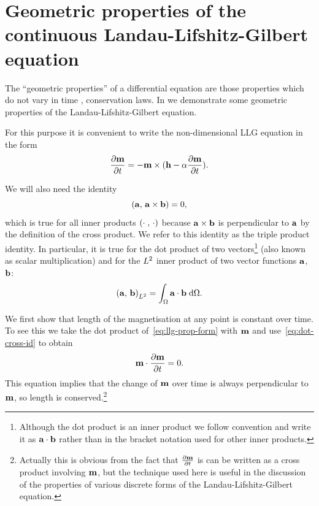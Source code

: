 \section{Geometric properties of the continuous Landau-Lifshitz-Gilbert equation}
\label{sec:prop-cont-llg}

The ``geometric properties'' of a differential equation are those properties which do not vary in time \cite[73]{Iserles2009}, \ie conservation laws.
In  we demonstrate some geometric properties of the Landau-Lifshitz-Gilbert equation.

For this purpose it is convenient to write the non-dimensional LLG equation in the form
\begin{equation}
  \label{eq:llg-prop-form}
  \frac{\partial \boldsymbol{\mathrm{m}}}{\partial t} = - \boldsymbol{\mathrm{m}} \times( \boldsymbol{\mathrm{h}} - \alpha \frac{\partial \boldsymbol{\mathrm{m}}}{\partial t}).
\end{equation}

We will also need the identity
\begin{equation}
  \label{eq:dot-cross-id}
  \left({\boldsymbol{\mathrm{a}}},\, {\boldsymbol{\mathrm{a}}} \times {\boldsymbol{\mathrm{b}}} \right) = 0,
\end{equation}
which is true for all inner products $\left(\cdot\;,\, \cdot \right)$ because ${\boldsymbol{\mathrm{a}}} \times {\boldsymbol{\mathrm{b}}}$ is perpendicular to ${\boldsymbol{\mathrm{a}}}$ by the definition of the cross product.
We refer to this identity as the triple product identity.
In particular, it is true for the dot product of two vectors\footnote{Although the dot product is an inner product we follow convention and write it as ${\boldsymbol{\mathrm{a}}} \cdot {\boldsymbol{\mathrm{b}}}$ rather than in the bracket notation used for other inner products.} (also known as scalar multiplication) and for the ${L^2}$ inner product of two vector functions ${\boldsymbol{\mathrm{a}}}$, ${\boldsymbol{\mathrm{b}}}$:
\begin{equation}
  \left({\boldsymbol{\mathrm{a}}},\, {\boldsymbol{\mathrm{b}}} \right)_{{L^2}} = {\int_{\Omega} {{\boldsymbol{\mathrm{a}}} \cdot {\boldsymbol{\mathrm{b}}}} {\; \mathrm{{d}}} {\Omega}}.
\end{equation}

We first show that length of the magnetisation at any point is constant over time.
To see this we take the dot product of~\cref{eq:llg-prop-form} with $\boldsymbol{\mathrm{m}}$ and use~\cref{eq:dot-cross-id} to obtain
\begin{equation}
  \label{eq:56}
  \boldsymbol{\mathrm{m}} \cdot \frac{\partial \boldsymbol{\mathrm{m}}}{\partial t} = 0.
\end{equation}
This equation implies that the change of $\boldsymbol{\mathrm{m}}$ over time is always perpendicular to $\boldsymbol{\mathrm{m}}$, so length is conserved.\footnote{Actually this is obvious from the fact that $\frac{\partial \boldsymbol{\mathrm{m}}}{\partial t}$ is can be written as a cross product involving $\boldsymbol{\mathrm{m}}$, but the technique used here is useful in the discussion of the properties of various discrete forms of the Landau-Lifshitz-Gilbert equation.}

